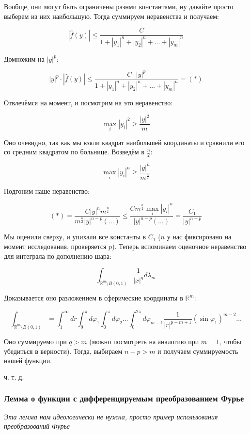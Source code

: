 \documentclass{article}
\begin{document}
Вообще, они могут быть ограничены разнми константами, ну давайте просто выберем из них наибольшую. Тогда суммируем неравенства и получаем: 

\[|\hat{f}(y)| \le \frac{C}{1 + |y_1|^n + |y_2|^n + \ldots + |y_m|^n}\]

Домножим на $|y|^p$:

\[|y|^p \cdot |\hat{f}(y)| \le \frac{C \cdot |y|^p}{1 + |y_1|^n + |y_2|^n + \ldots + |y_m|^n} = (*)\]

Отвлечёмся на момент, и посмотрим на это неравенство:

\[\max_{i} |y_i|^2 \ge \frac{|y|^2}{m}\]

Оно очевидно, так как мы взяли квадрат наибольшей координаты и сравнили его со средним квадратом по больнице. Возведём в $\frac{n}{2}$:

\[\max_{i} |y_i|^n \ge \frac{|y|^n}{m^{\frac{n}{2}}}\]

Подгоним наше неравенство:

\[(*) = \frac{C |y|^n m^{\frac{n}{2}}}{m^{\frac{n}{2}}|y|^{n - p} (\ldots)} \le \frac{Cm^{\frac{n}{2}}\max_{i}|y_i|^n}{|y|^{n - p}(\ldots)} = \frac{C_1}{|y|^{n - p}}\]

Мы оценили сверху, и упихали все константы в $C_1$ ($n$ у нас фиксировано на момент исследования, проверяется $p$). Теперь вспоминаем оценочное неравенство для интеграла по дополнению шара:

\[\int_{\mathbb{R}^m \setminus B(0, 1)} \frac{1}{|x|^q} d\lambda_m\]

Доказывается оно разложением в сферические координаты в $\mathbb{R}^m$:

\[\int_{\mathbb{R}^m \setminus B(0, 1)} = \int_{1}^{\infty} dr \int_{0}^{\pi} d\varphi_1\int_{0}^{\pi} d\varphi_2\ldots\int_{0}^{2\pi} d\varphi_{m - 1} \frac{1}{|r|^{p - m + 1}}(\sin \varphi_{1})^{m - 2} \ldots \]

Оно суммируемо при $q > m$ (можно посмотреть на аналогию при $m = 1$, чтобы убедиться в верности). Тогда, выбираем $n - p > m$ и получаем суммируемость нашей функции.

ч. т. д. 


\subsubsection{Лемма о функции с дифференцируемым преобразованием Фурье}

\textit{Эта лемма нам идеологически не нужна, просто пример использования преобразований Фурье}
\end{document}
